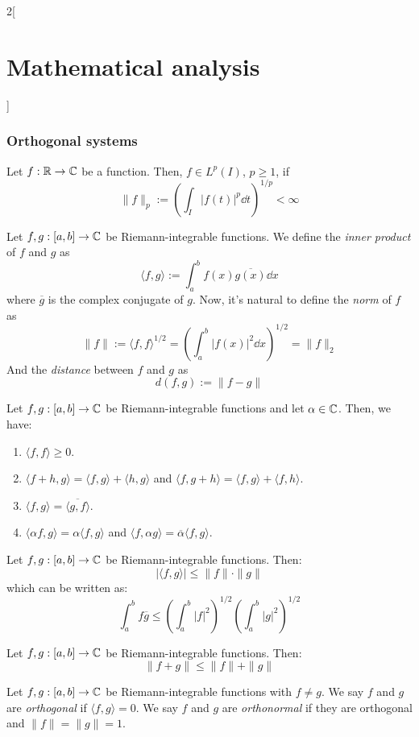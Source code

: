 \documentclass[../../../main.tex]{subfiles}
\begin{document}
\begin{multicols}{2}[\section{Mathematical analysis}]
  \subsubsection{Orthogonal systems}
  \begin{definition}
    Let $f:\mathbb{R} \rightarrow\mathbb{C} $ be a function. Then, $f\in L^p(I)$, $p\geq1$, if $$\|f\|_p:=\left(\int_I|f(t)|^p\dd{t}\right)^{1/p}<\infty$$
  \end{definition}
  \begin{definition}
    Let $f,g:[a,b]\rightarrow\mathbb{C} $ be Riemann-integrable functions. We define the \emph{inner product} of $f$ and $g$ as $$\langle f,g\rangle:=\int_a^bf(x)\overline{g(x)}\dd{x}$$ where $\overline{g}$ is the complex conjugate of $g$. Now, it's natural to define the \emph{norm} of $f$ as $$\|f\|:=\langle f,f\rangle^{1/2}=\left(\int_a^b{|f(x)|}^2\dd{x}\right)^{1/2}=\|f\|_2$$ And the \emph{distance} between $f$ and $g$ as $$d(f,g):=\|f-g\|$$
  \end{definition}
  \begin{proposition}
    Let $f,g:[a,b]\rightarrow\mathbb{C} $ be Riemann-integrable functions and let $\alpha\in\mathbb{C} $. Then, we have:
    \begin{enumerate}
      \item $\langle f,f\rangle\geq 0$.
      \item $\langle f+h,g\rangle=\langle f,g\rangle+\langle h,g\rangle$ and $\langle f,g+h\rangle=\langle f,g\rangle+\langle f,h\rangle$.
      \item $\langle f,g\rangle=\overline{\langle g,f\rangle}$.
      \item $\langle \alpha f,g\rangle=\alpha\langle f,g\rangle$ and $\langle f,\alpha g\rangle=\overline{\alpha}\langle f,g\rangle$.
    \end{enumerate}
  \end{proposition}
  \begin{theorem}
    Let $f,g:[a,b]\rightarrow\mathbb{C} $ be Riemann-integrable functions. Then: $$|\langle f,g\rangle|\leq\|f\|\cdot\|g\|$$ which can be written as: $$\int_a^bf\overline{g}\leq\left(\int_a^b{|f|}^2\right)^{1/2}\left(\int_a^b{|g|}^2\right)^{1/2}$$
  \end{theorem}
  \begin{theorem}
    Let $f,g:[a,b]\rightarrow\mathbb{C} $ be Riemann-integrable functions. Then: $$\| f+g\|\leq\|f\|+\|g\|$$
  \end{theorem}
  \begin{definition}
    Let $f,g:[a,b]\rightarrow\mathbb{C} $ be Riemann-integrable functions with $f\ne g$. We say $f$ and $g$ are \emph{orthogonal} if $\langle f,g\rangle=0$. We say $f$ and $g$ are \emph{orthonormal} if they are orthogonal and $\|f\|=\|g\|=1$.

\end{definition}
\end{multicols}
\end{document}
